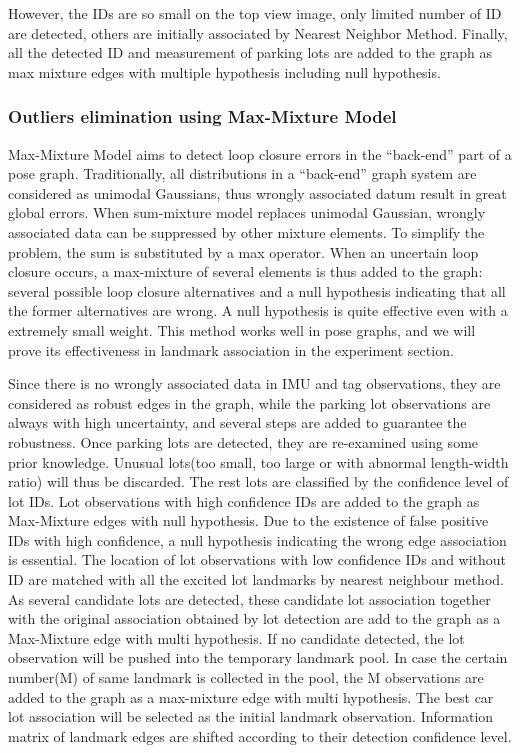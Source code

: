 \documentclass[journal]{IEEEtran}
\begin{document}
However, the IDs are so small on the top view image, only limited number of ID are detected, others are initially associated by Nearest Neighbor Method. 
Finally, all the detected ID and measurement of parking lots are added to the graph as max mixture \cite{Pfingsthorn2014Representing} edges with multiple hypothesis including null hypothesis.
%

\subsubsection{Outliers elimination using Max-Mixture Model}
Max-Mixture Model \cite{Pfingsthorn2014Representing} aims to detect loop closure errors in the “back-end” part of a pose graph. 
Traditionally, all distributions in a “back-end” graph system are considered as unimodal Gaussians, thus wrongly associated datum result in great global errors. 
When sum-mixture model replaces unimodal Gaussian, wrongly associated data can be suppressed by other mixture elements. 
To simplify the problem, the sum is substituted by a max operator. 
When an uncertain loop closure occurs, a max-mixture of several elements is thus added to the graph: several possible loop closure alternatives and a null hypothesis indicating that all the former alternatives are wrong. 
A null hypothesis is quite effective even with a extremely small weight.\cite{Pfingsthorn2014Representing}  
This method works well in pose graphs\cite{Latif2014Robust}\cite{Sunderhauf2013Switchable}\cite{Cadena:2016fp}, and we will prove its effectiveness in landmark association in the experiment section.

Since there is no wrongly associated data in IMU and tag observations, they are considered as robust edges in the graph, while the parking lot observations are always with high uncertainty, and several steps are added to guarantee the robustness. 
Once parking lots are detected, they are re-examined using some prior knowledge. 
Unusual lots(too small, too large or with abnormal length-width ratio) will thus be discarded. 
The rest lots are classified by the confidence level of lot IDs. Lot observations with high confidence IDs are added to the graph as Max-Mixture edges with null hypothesis. 
Due to the existence of false positive IDs with high confidence, a null hypothesis indicating the wrong edge association is essential. 
The location of lot observations with low confidence IDs and without ID are matched with all the excited lot landmarks by nearest neighbour method. 
As several candidate lots are detected, these candidate lot association together with the original association obtained by lot detection are add to the graph as a Max-Mixture edge with multi hypothesis. 
If no candidate detected, the lot observation will be pushed into the temporary landmark pool. 
In case the certain number(M) of same landmark is collected in the pool, the M observations are added to the graph as a max-mixture edge with multi hypothesis. 
The best car lot association will be selected as the initial landmark observation. Information matrix of landmark edges are shifted according to their detection confidence level.
\end{document}
